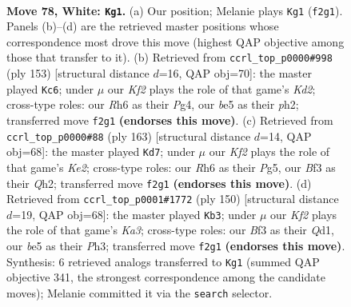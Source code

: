 \documentclass[11pt]{article}
\begin{document}
\clearpage

\begin{figure}[p]\centering
\begin{subfigure}{0.46\textwidth}\centering
\resizebox{\linewidth}{!}{%
\newchessgame
\chessboard[
  setfen={8/8/7R/4b3/8/1p1k1B2/3q1K2/8 w - - 12 78},
  showmover=false,
  pgfstyle=straightmove, color=movearrow, markmove={f2-g1}
]}
\caption{}
\end{subfigure}\hfill
\begin{subfigure}{0.46\textwidth}\centering
\resizebox{\linewidth}{!}{%
\newchessgame
\chessboard[
  setfen={8/3k1Q2/6K1/8/6p1/8/7P/2q5 b - - 15 77},
  showmover=false,
  pgfstyle=straightmove, color=movearrow, markmove={d7-c6}
]}
\caption{}
\end{subfigure}
\\[4pt]
\begin{subfigure}{0.46\textwidth}\centering
\resizebox{\linewidth}{!}{%
\newchessgame
\chessboard[
  setfen={8/4k3/P7/2Q3p1/2K5/8/7q/8 b - - 18 82},
  showmover=false,
  pgfstyle=straightmove, color=movearrow, markmove={e7-d7}
]}
\caption{}
\end{subfigure}\hfill
\begin{subfigure}{0.46\textwidth}\centering
\resizebox{\linewidth}{!}{%
\newchessgame
\chessboard[
  setfen={8/8/1k4P1/2q5/8/K6P/8/3Q4 w - - 7 76},
  showmover=false,
  pgfstyle=straightmove, color=movearrow, markmove={a3-b3}
]}
\caption{}
\end{subfigure}
\caption{\textbf{Move 78, White: \texttt{Kg1}.} (a) Our position; Melanie plays \texttt{Kg1} (\texttt{f2g1}). Panels (b)--(d) are the retrieved master positions whose correspondence most drove this move (highest QAP objective among those that transfer to it). (b) Retrieved from \texttt{ccrl\_top\_p0000\#998} (ply 153) [structural distance $d$=16, QAP obj=70]: the master played \texttt{Kc6}; under $\mu$ our \emph{Kf2} plays the role of that game's \emph{Kd2}; cross-type roles: our \emph{R}h6 as their \emph{P}g4, our \emph{b}e5 as their \emph{p}h2; transferred move \texttt{f2g1} \textbf{(endorses this move)}. (c) Retrieved from \texttt{ccrl\_top\_p0000\#88} (ply 163) [structural distance $d$=14, QAP obj=68]: the master played \texttt{Kd7}; under $\mu$ our \emph{Kf2} plays the role of that game's \emph{Ke2}; cross-type roles: our \emph{R}h6 as their \emph{P}g5, our \emph{B}f3 as their \emph{Q}h2; transferred move \texttt{f2g1} \textbf{(endorses this move)}. (d) Retrieved from \texttt{ccrl\_top\_p0001\#1772} (ply 150) [structural distance $d$=19, QAP obj=68]: the master played \texttt{Kb3}; under $\mu$ our \emph{Kf2} plays the role of that game's \emph{Ka3}; cross-type roles: our \emph{B}f3 as their \emph{Q}d1, our \emph{b}e5 as their \emph{P}h3; transferred move \texttt{f2g1} \textbf{(endorses this move)}. Synthesis: 6 retrieved analogs transferred to \texttt{Kg1} (summed QAP objective 341, the strongest correspondence among the candidate moves); Melanie committed it via the \texttt{search} selector.}
\label{fig:thought-m154}
\end{figure}
\end{document}
